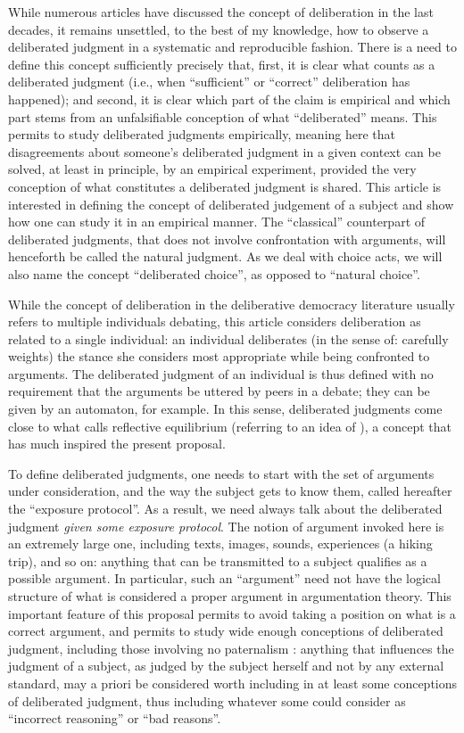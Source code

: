 \documentclass[version=last, pagesize, twoside=off, bibliography=totoc, DIV=calc, fontsize=12pt, a4paper, french, english]{scrartcl}
\begin{document}
While numerous articles have discussed the concept of deliberation in the last decades, it remains unsettled, to the best of my knowledge, how to observe a deliberated judgment in a systematic and reproducible fashion. There is a need to define this concept sufficiently precisely that, first, it is clear what counts as a deliberated judgment (i.e., when “sufficient” \citep{meinard_justification_2020} or “correct” deliberation has happened); and second, it is clear which part of the claim is empirical and which part stems from an unfalsifiable conception of what “deliberated” means. This permits to study deliberated judgments empirically, meaning here that disagreements about someone’s deliberated judgment in a given context can be solved, at least in principle, by an empirical experiment, provided the very conception of what constitutes a deliberated judgment is shared. This article is interested in defining the concept of deliberated judgement of a subject and show how one can study it in an empirical manner. The “classical” counterpart of deliberated judgments, that does not involve confrontation with arguments, will henceforth be called the natural judgment. As we deal with choice acts, we will also name the concept “deliberated choice”, as opposed to “natural choice”.

While the concept of deliberation in the deliberative democracy literature usually refers to multiple individuals debating, this article considers deliberation as related to a single individual: an individual deliberates (in the sense of: carefully weights) the stance she considers most appropriate while being confronted to arguments. The deliberated judgment of an individual is thus defined with no requirement that the arguments be uttered by peers in a debate; they can be given by an automaton, for example. In this sense, deliberated judgments come close to what \citet{rawls_theory_1999} calls reflective equilibrium (referring to an idea of \citet{goodman_fact_1983}), a concept that has much inspired the present proposal.

To define deliberated judgments, one needs to start with the set of arguments under consideration, and the way the subject gets to know them, called hereafter the “exposure protocol”. As a result, we need always talk about the deliberated judgment \emph{given some exposure protocol}. The notion of argument invoked here is an extremely large one, including texts, images, sounds, experiences (a hiking trip), and so on: anything that can be transmitted to a subject qualifies as a possible argument. In particular, such an “argument” need not have the logical structure of what is considered a proper argument in argumentation theory. This important feature of this proposal permits to avoid taking a position on what is a correct argument, and permits to study wide enough conceptions of deliberated judgment, including those involving no paternalism \citep{cailloux_formal_2020}: anything that influences the judgment of a subject, as judged by the subject herself and not by any external standard, may a priori be considered worth including in at least some conceptions of deliberated judgment, thus including whatever some could consider as “incorrect reasoning” or “bad reasons”.
\end{document}
